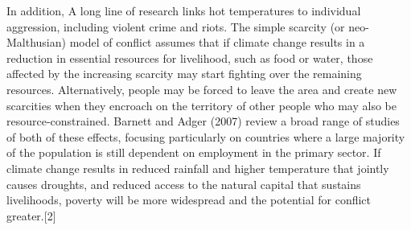 \documentclass{mcmthesis}
\begin{document}
	In addition, A long line of research links hot temperatures to individual aggression, including violent crime and riots. The simple scarcity (or neo-Malthusian) model of conflict assumes that if climate change results in a reduction in essential resources for livelihood, such as food or water, those affected by the increasing scarcity may start fighting over the remaining resources. Alternatively, people may be forced to leave the area and create new scarcities when they encroach on the territory of other people who may also be resource-constrained. Barnett and Adger (2007) review a broad range of studies of both of these effects, focusing particularly on countries where a large majority of the population is still dependent on employment in the primary sector. If climate change results in reduced rainfall and higher temperature that jointly causes droughts, and reduced access to the natural capital that sustains livelihoods, poverty will be more widespread and the potential for conflict greater.[2]
	
\end{document}
